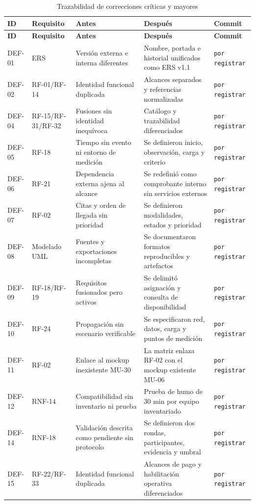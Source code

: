 \documentclass[11pt,a4paper]{article}
\begin{document}
	\begin{longtable}{p{1.1cm}p{2.1cm}p{4.2cm}p{4.2cm}p{2.0cm}}
		\caption{Trazabilidad de correcciones críticas y mayores}\\
		\toprule
		\textbf{ID} & \textbf{Requisito} & \textbf{Antes} & \textbf{Después} & \textbf{Commit}\\
		\midrule\endfirsthead
		\toprule
		\textbf{ID} & \textbf{Requisito} & \textbf{Antes} & \textbf{Después} & \textbf{Commit}\\
		\midrule\endhead
		DEF-01 & ERS & Versión externa e interna diferentes & Nombre, portada e historial unificados como ERS v1.1 & \texttt{por registrar}\\
		DEF-02 & RF-01/RF-14 & Identidad funcional duplicada & Alcances separados y referencias normalizadas & \texttt{por registrar}\\
		DEF-04 & RF-15/RF-31/RF-32 & Fusiones sin identidad inequívoca & Catálogo y trazabilidad diferenciados & \texttt{por registrar}\\
		DEF-05 & RF-18 & Tiempo sin evento ni entorno de medición & Se definieron inicio, observación, carga y criterio & \texttt{por registrar}\\
		DEF-06 & RF-21 & Dependencia externa ajena al alcance & Se redefinió como comprobante interno sin servicios externos & \texttt{por registrar}\\
		DEF-07 & RF-02 & Citas y orden de llegada sin prioridad & Se definieron modalidades, estados y prioridad & \texttt{por registrar}\\
		DEF-08 & Modelado UML & Fuentes y exportaciones incompletas & Se documentaron formatos reproducibles y artefactos & \texttt{por registrar}\\
		DEF-09 & RF-18/RF-19 & Requisitos fusionados pero activos & Se delimitó asignación y consulta de disponibilidad & \texttt{por registrar}\\
		DEF-10 & RF-24 & Propagación sin escenario verificable & Se especificaron red, datos, carga y puntos de medición & \texttt{por registrar}\\
		DEF-11 & RF-02 & Enlace al mockup inexistente MU-30 & La matriz enlaza RF-02 con el mockup existente MU-06 & \texttt{por registrar}\\
		DEF-12 & RNF-14 & Compatibilidad sin inventario ni prueba & Prueba de humo de 30 min por equipo inventariado & \texttt{por registrar}\\
		DEF-14 & RNF-18 & Validación descrita como pendiente sin protocolo & Se definieron dos rondas, participantes, evidencia y umbral & \texttt{por registrar}\\
		DEF-15 & RF-22/RF-33 & Identidad funcional duplicada & Alcances de pago y habilitación operativa diferenciados & \texttt{por registrar}\\
		\bottomrule
	\end{longtable}
	
\end{document}
